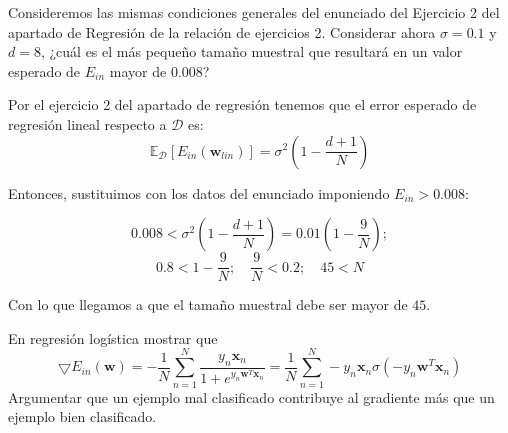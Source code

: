 \documentclass[11pt,leqno]{article}
\theoremstyle{definition}
\begin{document}
\begin{cuestion}
Consideremos las mismas condiciones generales del enunciado del Ejercicio 2 del apartado de Regresión de la relación de ejercicios 2. Considerar ahora $\sigma = 0.1$ y $d = 8$, ¿cuál es el más pequeño tamaño muestral que resultará en un valor esperado de $E_{in}$ mayor de $0.008$?
\end{cuestion}

\begin{solucion}
Por el ejercicio 2 del apartado de regresión tenemos que el error esperado de regresión lineal respecto a $\mathcal{D}$ es:
\[ \mathbb{E}_\mathcal{D}[ E_{in}(\mathbf{w}_{lin})] =
		\sigma^2 \left( 1 - \frac{d+1}{N} \right) \]
		
Entonces, sustituimos con los datos del enunciado imponiendo $E_{in} > 0.008$:

\[ 0.008 < \sigma^2 \left( 1 - \frac{d+1}{N} \right) =
			0.01 \left( 1 - \frac{9}{N} \right); \]
\[ 0.8 < 1 - \frac{9}{N};\quad \frac{9}{N} < 0.2;\quad 45 < N 	\]

Con lo que llegamos a que el tamaño muestral debe ser mayor de $45$.

\end{solucion}

\begin{cuestion}
En regresión logística mostrar que
\[ \bigtriangledown E_{in}(\mathbf{w})=
		-\frac{1}{N} 
		\sum\limits_{n=1}^N \frac{y_n \mathbf{x}_n}
				{1+e^{y_n \mathbf{w}^T\mathbf{x}_n}} = 
		\frac{1}{N}
		\sum\limits_{n=1}^N - y_n\mathbf{x}_n
					\sigma(-y_n\mathbf{w}^T\mathbf{x}_n) \]
Argumentar que un ejemplo mal clasificado contribuye al gradiente más que un ejemplo bien clasificado.
\end{cuestion}
\end{document}
